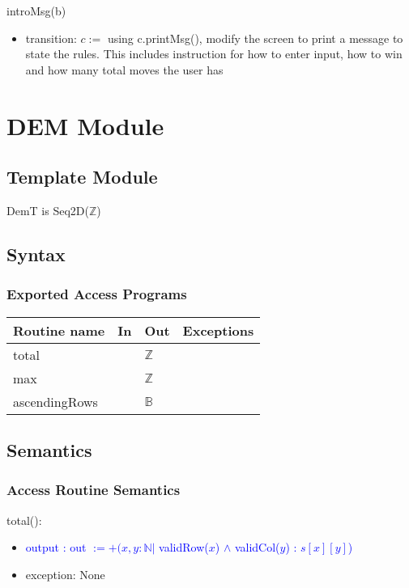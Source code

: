 \documentclass[12pt]{article}
\begin{document}
\noindent introMsg(b)
\begin{itemize}
\item transition: $c :=$ using c.printMsg(), modify the screen to print a message to state the rules. This includes instruction for how to enter input, how to win and how many total moves the user has
\end{itemize}

\newpage

\section* {DEM Module}

\subsection* {Template Module}

DemT is Seq2D($\mathbb{Z}$)

\subsection* {Syntax}

\subsubsection* {Exported Access Programs}

\begin{tabular}{| l | l | l | p{6cm} |}
\hline
\textbf{Routine name} & \textbf{In} & \textbf{Out} & \textbf{Exceptions}\\
\hline
total & & $\mathbb{Z}$ & \\
\hline
max &  & $\mathbb{Z}$ & \\
\hline
ascendingRows & & $\mathbb{B}$ & \\
\hline
\end{tabular}

\subsection* {Semantics}

\subsubsection* {Access Routine Semantics}

\noindent total(): 
\begin{itemize}
\item \textcolor{blue}{output : out $:= +(x, y : \mathbb{N} |$ validRow($x$) $\land$ validCol($y$) : $s[x][y]$)}
\item exception: None
\end{itemize}
\end{document}
